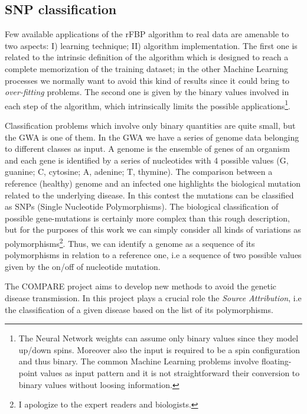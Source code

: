 \documentclass{standalone}
\begin{document}
\subsection[Compare dataset]{SNP classification}\label{rfbp:snp}

Few available applications of the \textsf{rFBP} algorithm to real data are amenable to two aspects: I) learning technique; II) algorithm implementation.
The first one is related to the intrinsic definition of the algorithm which is designed to reach a complete memorization of the training dataset; in the other Machine Learning processes we normally want to avoid this kind of results since it could bring to \emph{over-fitting} problems.
The second one is given by the binary values involved in each step of the algorithm, which intrinsically limits the possible applications\footnote{
  The Neural Network weights can assume only binary values since they model up/down spins.
  Moreover also the input is required to be a spin configuration and thus binary.
  The common Machine Learning problems involve floating-point values as input pattern and it is not straightforward their conversion to binary values without loosing information.
}.

Classification problems which involve only binary quantities are quite small, but the GWA is one of them.
In the GWA we have a series of genome data belonging to different classes as input.
A genome is the ensemble of genes of an organism and each gene is identified by a series of nucleotides with 4 possible values (G, guanine; C, cytosine; A, adenine; T, thymine).
The comparison between a reference (healthy) genome and an infected one highlights the biological mutation related to the underlying disease.
In this contest the mutations can be classified as SNPs (Single Nucleotide Polymorphisms).
The biological classification of possible gene-mutations is certainly more complex than this rough description, but for the purposes of this work we can simply consider all kinds of variations as polymorphisms\footnote{I apologize to the expert readers and biologists.}.
Thus, we can identify a genome as a sequence of its polymorphisms in relation to a reference one, i.e a sequence of two possible values given by the on/off of nucleotide mutation.

The COMPARE project aims to develop new methods to avoid the genetic disease transmission.
In this project plays a crucial role the \emph{Source Attribution}, i.e the classification of a given disease based on the list of its polymorphisms.
\end{document}
